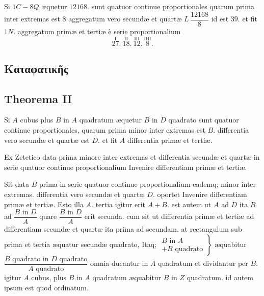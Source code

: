 \documentclass[11pt,a4paper]{article}
\begin{document}
Si $1C - 8Q$ æquetur $12168$. sunt quatuor continue proportionales quarum prima inter extremas est $8$ aggregatum vero secundæ et quartæ $L\,\dfrac{12168}{8}$ id est $39$. et fit $1N.$ aggregatum primæ et tertiæ è serie proportionalium
\[ \overset{\mathrm{I}}{27}.\ \overset{\mathrm{II}}{18}.\ \overset{\mathrm{III}}{12}.\ \overset{\mathrm{IIII}}{8}. \]

\subsection*{Καταφατικῆς}

\subsection*{Theorema II}

Si $A$ cubus plus $B$ in $A$ quadratum æquetur $B$ in $D$ quadrato sunt quatuor continue proportionales, quarum prima minor inter extremas est $B$. differentia vero secundæ et quartæ est $D$. et fit $A$ differentia primæ et tertiæ.


Ex Zetetico data prima minore inter extremas et differentia secundæ et quartæ in serie quatuor continue proportionalium Invenire differentiam primæ et tertiæ.

Sit data $B$ prima in serie quatuor continue proportionalium eademq; minor inter extremas. differentia vero secundæ et quartæ $D$. oportet Invenire differentiam primæ et tertiæ. Esto illa $A$. tertia igitur erit $A + B$. est autem ut $A$ ad $D$ ita $B$ ad $\dfrac{B \text{ in } D}{A}$ quare $\dfrac{B \text{ in } D}{A}$ erit secunda. cum sit ut differentia primæ et tertiæ ad differentiam secundæ et quartæ ita prima ad secundam. at rectangulum sub prima et tertia æquatur secundæ quadrato, Itaq; $\left.\begin{array}{l} B \text{ in } A \\ + B \text{ quadrato} \end{array}\right\}$ æquabitur $\dfrac{B \text{ quadrato in } D \text{ quadrato}}{A \text{ quadrato}}$ omnia ducantur in $A$ quadratum et dividantur per $B$. igitur $A$ cubus, plus $B$ in $A$ quadratum æquabitur $B$ in $Z$ quadratum. id autem ipsum est quod ordinatum.
\end{document}
